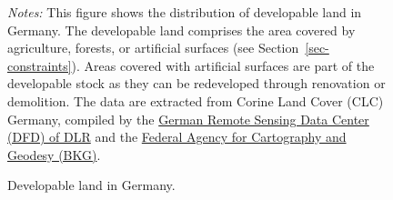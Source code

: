\documentclass[
  12pt,
]{article}
\begin{document}
\begin{figure}


\caption{\label{fig-developable-land}Developable land in
Germany.}
\begin{minipage}{0.975\textwidth}
\small
\emph{Notes:} This figure shows the
distribution of developable land in Germany. The developable land
comprises the area covered by agriculture, forests, or artificial
surfaces (see Section~\ref{sec-constraints}). Areas covered with
artificial surfaces are part of the developable stock as they can be
redeveloped through renovation or demolition. The data are extracted
from Corine Land Cover (CLC) Germany, compiled by the
\href{https://www.dlr.de/eoc/en/desktopdefault.aspx/tabid-11882/20871_read-48836}{German
Remote Sensing Data Center (DFD) of DLR} and the
\href{https://www.bkg.bund.de}{Federal Agency for Cartography and
Geodesy (BKG)}.
\end{minipage}


\end{figure}%
\end{document}
